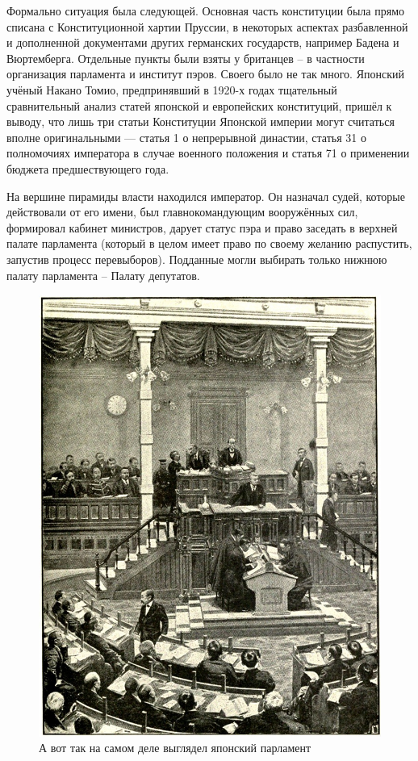 Формально ситуация была следующей. Основная часть конституции была прямо списана с Конституционной хартии Пруссии, в некоторых аспектах разбавленной и дополненной документами других германских государств, например Бадена и Вюртемберга. Отдельные пункты были взяты у британцев – в частности организация парламента и институт пэров. Своего было не так много. Японский учёный Накано Томио, предпринявший в 1920-х годах тщательный сравнительный анализ статей японской и европейских конституций, пришёл к выводу, что лишь три статьи Конституции Японской империи могут считаться вполне оригинальными — статья 1 о непрерывной династии, статья 31 о полномочиях императора в случае военного положения и статья 71 о применении бюджета предшествующего года.

На вершине пирамиды власти находился император. Он назначал судей, которые действовали от его имени, был главнокомандующим вооружённых сил, формировал кабинет министров, дарует статус пэра и право заседать в верхней палате парламента (который в целом имеет право по своему желанию распустить, запустив процесс перевыборов). Подданные могли выбирать только нижнюю палату парламента – Палату депутатов. 

\begin{figure}[h!tb] 
	\centering\includegraphics[scale=0.5]{Glava2/z8Rrmsg8n38.jpg}
	\caption{А вот так на самом деле выглядел японский парламент}%
\end{figure}

